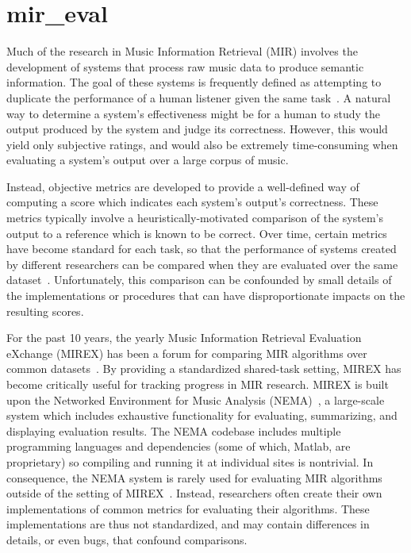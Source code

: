 \section{mir\_eval}
\label{sec:mir_eval}

Much of the research in Music Information Retrieval (MIR) involves the development of systems that process raw music data to produce semantic information.
The goal of these systems is frequently defined as attempting to duplicate the
performance of a human listener given the same task~\cite{downie2003toward}.
A natural way to determine a system's effectiveness might be for a human to study the output produced by the system and judge its correctness.
However, this would yield only subjective ratings, and would also be extremely time-consuming when evaluating a system's output over a large corpus of music.

Instead, objective metrics are developed to provide a well-defined way of computing a score which indicates each system's output's correctness.
These metrics typically involve a heuristically-motivated comparison of the system's output to a reference which is known to be correct.
Over time, certain metrics have become standard for each task, so that the performance
of systems created by different researchers can be compared when they are evaluated
over the same dataset~\cite{downie2003toward}.
Unfortunately, this comparison can be confounded by small details of the implementations or procedures that can have disproportionate impacts on the resulting scores.

For the past 10 years, the yearly Music Information Retrieval Evaluation eXchange
(MIREX) has been a forum for comparing MIR algorithms over common datasets~\cite{downie2008music}.
By providing a standardized shared-task setting, MIREX has become critically useful for tracking progress in MIR research.
MIREX is built upon the Networked Environment for Music Analysis (NEMA)~\cite{west2010networked}, a large-scale system which includes exhaustive functionality for evaluating, summarizing, and displaying evaluation results.
The NEMA codebase includes multiple programming languages and dependencies (some of which, Matlab, are proprietary) so compiling and running it at individual sites is nontrivial.
%
In consequence, the NEMA system is rarely used for evaluating MIR algorithms outside of
the setting of MIREX~\cite{downie2008music}.
Instead, researchers often create their own implementations of common metrics for evaluating their algorithms.
These implementations are thus not standardized, and may contain differences in details, or even bugs, that confound comparisons.

